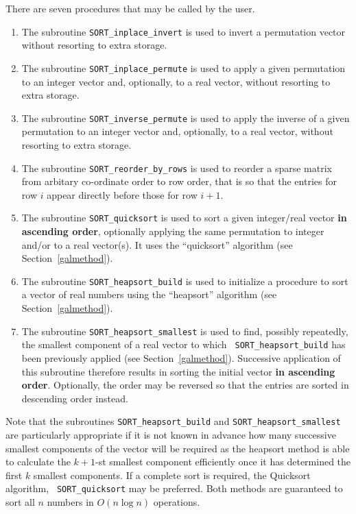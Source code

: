 \documentclass{galahad}
\newcommand{\packagename}{SORT}
\begin{document}
There are seven procedures that may be called by the user.
\begin{enumerate}
\item The subroutine {\tt \packagename\_inplace\_invert} is used to invert a
permutation vector without resorting to extra storage.
\item The subroutine {\tt \packagename\_inplace\_permute} is used to apply
a given permutation to an integer vector and, optionally,
to a real vector, without resorting to extra storage.
\item The subroutine {\tt \packagename\_inverse\_permute} is used to apply
the inverse of a given permutation to an integer vector
and, optionally, to a real vector, without resorting to extra
storage.
\item The subroutine {\tt \packagename\_reorder\_by\_rows} is used to
reorder a sparse matrix from arbitary co-ordinate order to row
order, that is so that the entries for row $i$ appear directly before
those for row $i+1$.
\item The subroutine {\tt \packagename\_quicksort} is used to sort
a given integer/real vector {\bf in ascending order}, optionally applying the
same permutation to integer and/or to a real vector(s). It uses the
``quicksort'' algorithm (see Section~\ref{galmethod}).
\item The subroutine {\tt \packagename\_heapsort\_build} is used to initialize
a procedure to sort a vector of real numbers using
the ``heapsort'' algorithm (see Section~\ref{galmethod}).
\item The subroutine {\tt \packagename\_heapsort\_smallest} is used to find,
possibly repeatedly, the smallest component of a real vector to which {\tt
\packagename\_heapsort\_build} has been previously applied (see
Section~\ref{galmethod}). Successive application of this subroutine therefore
results in sorting the initial vector {\bf in ascending order}. Optionally,
the order may be reversed so that the entries are sorted in descending order
instead.
\end{enumerate}

\noindent
Note that the subroutines {\tt \packagename\_heapsort\_build}
and {\tt \packagename\_heapsort\_smallest} are particularly appropriate if
it is not known in advance how many successive smallest components of the
vector will be required as the heapsort method is
able to calculate the $k+1$-st smallest component efficiently
once it has determined the first $k$ smallest components.
If a complete sort is required, the Quicksort algorithm, {\tt
\packagename\_quicksort} may be preferred. Both methods are
guaranteed to sort all $n$ numbers in $O( n \log n )$ operations.
\end{document}
